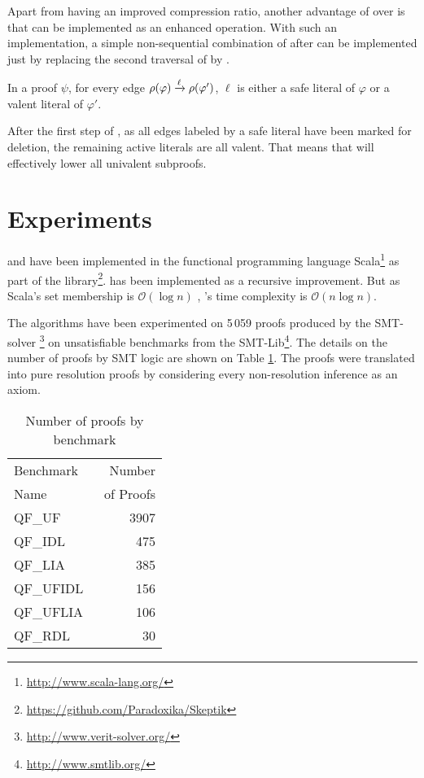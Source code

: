 \documentclass{llncs}
\begin{document}
Apart from having an improved compression ratio, another advantage of {\LowerUnivalents} over
{\LowerUnits} is that {\LowerUnivalents} can be implemented as an enhanced 
operation. With such an implementation, a simple non-sequential combination of {\LowerUnivalents}
after {\RPI} can be implemented just by replacing the second traversal of {\RPI} by
{\LowerUnivalents}.

\begin{proposition} \label{prop:LunivRPI}
In a proof $\psi$, for every edge $\rho(\varphi) \xrightarrow{\ell} \rho(\varphi')$, $\ell$ is either a safe literal
of $\varphi$ or a valent literal of $\varphi'$.
\end{proposition}

After the first step of {\RPI}, as all edges labeled by a safe literal have been marked for
deletion, the remaining active literals are all valent. That means that {\LowerUnivalents} will
effectively lower all univalent subproofs.



\section{Experiments} \label{sec:exp}

{\LowerUnivalents} and {\LUnivRPI} have been implemented in the functional programming
language Scala\footnote{\url{http://www.scala-lang.org/}} as part of the \skeptik
library\footnote{\url{https://github.com/Paradoxika/Skeptik}}. {\LowerUnivalents} has been implemented as a
recursive  improvement. But as Scala's set membership is $\mathcal{O}(\log{n})$ \cite{ToDo},
{\LowerUnivalents}'s time complexity is $\mathcal{O}(n \log{n})$.

The algorithms have been experimented on 5\,059 proofs produced by the SMT-solver
{\veriT}\footnote{\url{http://www.verit-solver.org/}} on unsatisfiable benchmarks from the
SMT-Lib\footnote{\url{http://www.smtlib.org/}}.  The details on the number of proofs by SMT logic
are shown on Table \ref{tab:benchmarks}.  The proofs were translated into pure resolution proofs by
considering every non-resolution inference as an axiom.

\begin{table}[tb]
  \caption{Number of proofs by benchmark}
  \label{tab:benchmarks}
  \centering
  \begin{tabular}{lr}
    \toprule
    Benchmark~ &  Number \\
    Name       & ~of Proofs \\
    \midrule
    QF\_UF      & 3907 \\
    QF\_IDL     &  475 \\
    QF\_LIA     &  385 \\
    QF\_UFIDL   &  156 \\
    QF\_UFLIA   &  106 \\
    QF\_RDL     &   30 \\
    \bottomrule
  \end{tabular}
\end{table}
\end{document}

